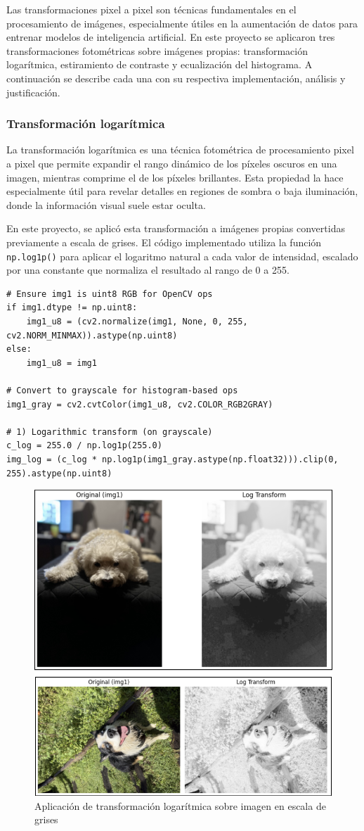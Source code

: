 \documentclass[12pt,letterpaper]{article}
\begin{document}
Las transformaciones pixel a pixel son técnicas fundamentales en el procesamiento de imágenes, especialmente útiles en la aumentación de datos para entrenar modelos de inteligencia artificial. En este proyecto se aplicaron tres transformaciones fotométricas sobre imágenes propias: transformación logarítmica, estiramiento de contraste y ecualización del histograma. A continuación se describe cada una con su respectiva implementación, análisis y justificación.

\subsubsection{Transformación logarítmica}

La transformación logarítmica es una técnica fotométrica de procesamiento pixel a pixel que permite expandir el rango dinámico de los píxeles oscuros en una imagen, mientras comprime el de los píxeles brillantes. Esta propiedad la hace especialmente útil para revelar detalles en regiones de sombra o baja iluminación, donde la información visual suele estar oculta.

En este proyecto, se aplicó esta transformación a imágenes propias convertidas previamente a escala de grises. El código implementado utiliza la función \texttt{np.log1p()} para aplicar el logaritmo natural a cada valor de intensidad, escalado por una constante que normaliza el resultado al rango de 0 a 255.

\begin{verbatim}
# Ensure img1 is uint8 RGB for OpenCV ops
if img1.dtype != np.uint8:
    img1_u8 = (cv2.normalize(img1, None, 0, 255, cv2.NORM_MINMAX)).astype(np.uint8)
else:
    img1_u8 = img1

# Convert to grayscale for histogram-based ops
img1_gray = cv2.cvtColor(img1_u8, cv2.COLOR_RGB2GRAY)

# 1) Logarithmic transform (on grayscale)
c_log = 255.0 / np.log1p(255.0)
img_log = (c_log * np.log1p(img1_gray.astype(np.float32))).clip(0, 255).astype(np.uint8)
\end{verbatim}

\begin{figure}[H]
  \centering
  \includegraphics[width=0.5\linewidth]{figuras/transformacion_log.png}
  \caption{Aplicación de transformación logarítmica sobre imagen en escala de grises}
  \label{fig:transformacion_logaritmica}
\end{figure}
\end{document}
